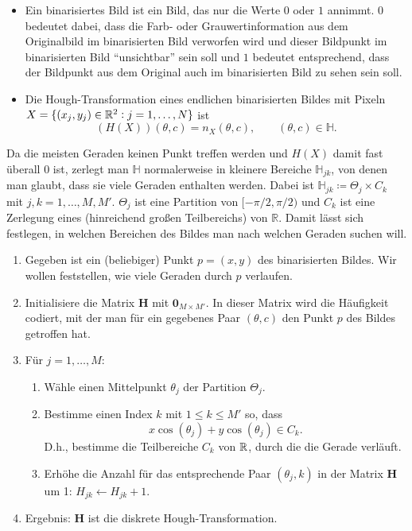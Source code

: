\begin{definition} \leavevmode
\begin{itemize}
\item Ein binarisiertes Bild ist ein Bild, das nur die Werte $ 0 $ oder $ 1 $ annimmt.
  $ 0 $ bedeutet dabei, dass die Farb- oder Grauwertinformation aus dem Originalbild im 
  binarisierten Bild verworfen wird und dieser Bildpunkt im binarisierten Bild \enquote{unsichtbar} 
  sein soll und $ 1 $ bedeutet entsprechend, dass der Bildpunkt aus dem Original auch im 
  binarisierten Bild zu sehen sein soll.
\item Die Hough-Transformation eines endlichen binarisierten Bildes mit Pixeln
  $ X = \{ (x_{j}, y_{j}) \in \mathbb{R}^{2} : j = 1, \ldots, N \} $ ist
  \[
    (H(X))(\theta, c) = n_{X}(\theta, c), \qquad (\theta, c) \in \mathbb{H}.
  \]
\end{itemize}
\end{definition}

Da die meisten Geraden keinen Punkt treffen werden und $ H(X) $ damit fast überall $ 0 $ ist,
zerlegt man $ \mathbb{H} $ normalerweise in kleinere Bereiche $ \mathbb{H}_{jk} $, von denen man
glaubt, dass sie viele Geraden enthalten werden. Dabei ist
$ \mathbb{H}_{jk} \coloneqq \Theta_{j} \times C_{k} $ mit $ j,k = 1, \ldots, M, M' $. $ \Theta_{j} $
ist eine Partition von $ [-\pi / 2, \pi / 2) $ und $ C_{k} $ ist eine Zerlegung eines (hinreichend
großen Teilbereichs) von $ \mathbb{R} $. Damit lässt sich festlegen, in welchen Bereichen des Bildes
man nach welchen Geraden suchen will.

\begin{remark} \leavevmode
\begin{enumerate}
\item Gegeben ist ein (beliebiger) Punkt $ p = (x,y) $ des binarisierten Bildes. Wir wollen 
  feststellen, wie viele Geraden durch $ p $ verlaufen.
\item Initialisiere die Matrix $ \mathbf{H} $ mit $ \mathbf{0}_{M \times M'} $. In dieser Matrix
  wird die Häufigkeit codiert, mit der man für ein gegebenes Paar $ (\theta, c) $ den Punkt $ p $
  des Bildes getroffen hat.
\item Für $ j = 1, \ldots, M $:
  \begin{enumerate}
  \item Wähle einen Mittelpunkt $ \theta_{j} $ der Partition $ \Theta_{j} $.
  \item Bestimme einen Index $ k $ mit $ 1 \leq k \leq M' $ so, dass
    \[
      x \cos(\theta_{j}) + y \cos(\theta_{j}) \in C_{k}.
    \]
    D.h., bestimme die Teilbereiche $ C_{k} $ von $ \mathbb{R} $, durch die die Gerade verläuft.
  \item Erhöhe die Anzahl für das entsprechende Paar $ (\theta_{j}, k) $ in der Matrix
  $ \mathbf{H} $ um 1: $ H_{jk} \leftarrow H_{jk} + 1 $.
  \end{enumerate}
\item Ergebnis: $ \mathbf{H} $ ist die diskrete Hough-Transformation.
\end{enumerate}
\end{remark}

